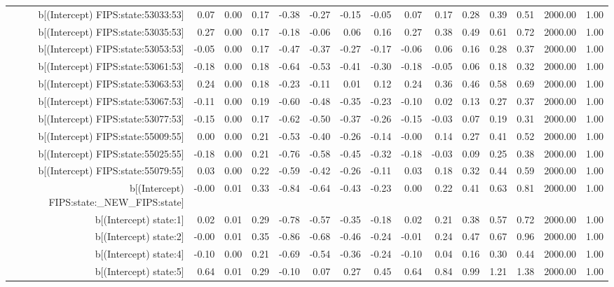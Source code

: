 \begin{table}[ht]
\begin{tabular}{rrrrrrrrrrrrrrr}
  b[(Intercept) FIPS:state:53033:53] & 0.07 & 0.00 & 0.17 & -0.38 & -0.27 & -0.15 & -0.05 & 0.07 & 0.17 & 0.28 & 0.39 & 0.51 & 2000.00 & 1.00 \\ 
  b[(Intercept) FIPS:state:53035:53] & 0.27 & 0.00 & 0.17 & -0.18 & -0.06 & 0.06 & 0.16 & 0.27 & 0.38 & 0.49 & 0.61 & 0.72 & 2000.00 & 1.00 \\ 
  b[(Intercept) FIPS:state:53053:53] & -0.05 & 0.00 & 0.17 & -0.47 & -0.37 & -0.27 & -0.17 & -0.06 & 0.06 & 0.16 & 0.28 & 0.37 & 2000.00 & 1.00 \\ 
  b[(Intercept) FIPS:state:53061:53] & -0.18 & 0.00 & 0.18 & -0.64 & -0.53 & -0.41 & -0.30 & -0.18 & -0.05 & 0.06 & 0.18 & 0.32 & 2000.00 & 1.00 \\ 
  b[(Intercept) FIPS:state:53063:53] & 0.24 & 0.00 & 0.18 & -0.23 & -0.11 & 0.01 & 0.12 & 0.24 & 0.36 & 0.46 & 0.58 & 0.69 & 2000.00 & 1.00 \\ 
  b[(Intercept) FIPS:state:53067:53] & -0.11 & 0.00 & 0.19 & -0.60 & -0.48 & -0.35 & -0.23 & -0.10 & 0.02 & 0.13 & 0.27 & 0.37 & 2000.00 & 1.00 \\ 
  b[(Intercept) FIPS:state:53077:53] & -0.15 & 0.00 & 0.17 & -0.62 & -0.50 & -0.37 & -0.26 & -0.15 & -0.03 & 0.07 & 0.19 & 0.31 & 2000.00 & 1.00 \\ 
  b[(Intercept) FIPS:state:55009:55] & 0.00 & 0.00 & 0.21 & -0.53 & -0.40 & -0.26 & -0.14 & -0.00 & 0.14 & 0.27 & 0.41 & 0.52 & 2000.00 & 1.00 \\ 
  b[(Intercept) FIPS:state:55025:55] & -0.18 & 0.00 & 0.21 & -0.76 & -0.58 & -0.45 & -0.32 & -0.18 & -0.03 & 0.09 & 0.25 & 0.38 & 2000.00 & 1.00 \\ 
  b[(Intercept) FIPS:state:55079:55] & 0.03 & 0.00 & 0.22 & -0.59 & -0.42 & -0.26 & -0.11 & 0.03 & 0.18 & 0.32 & 0.44 & 0.59 & 2000.00 & 1.00 \\ 
  b[(Intercept) FIPS:state:\_NEW\_FIPS:state] & -0.00 & 0.01 & 0.33 & -0.84 & -0.64 & -0.43 & -0.23 & 0.00 & 0.22 & 0.41 & 0.63 & 0.81 & 2000.00 & 1.00 \\ 
  b[(Intercept) state:1] & 0.02 & 0.01 & 0.29 & -0.78 & -0.57 & -0.35 & -0.18 & 0.02 & 0.21 & 0.38 & 0.57 & 0.72 & 2000.00 & 1.00 \\ 
  b[(Intercept) state:2] & -0.00 & 0.01 & 0.35 & -0.86 & -0.68 & -0.46 & -0.24 & -0.01 & 0.24 & 0.47 & 0.67 & 0.96 & 2000.00 & 1.00 \\ 
  b[(Intercept) state:4] & -0.10 & 0.00 & 0.21 & -0.69 & -0.54 & -0.36 & -0.24 & -0.10 & 0.04 & 0.16 & 0.30 & 0.44 & 2000.00 & 1.00 \\ 
  b[(Intercept) state:5] & 0.64 & 0.01 & 0.29 & -0.10 & 0.07 & 0.27 & 0.45 & 0.64 & 0.84 & 0.99 & 1.21 & 1.38 & 2000.00 & 1.00 \\ 

\end{tabular}
\end{table}
